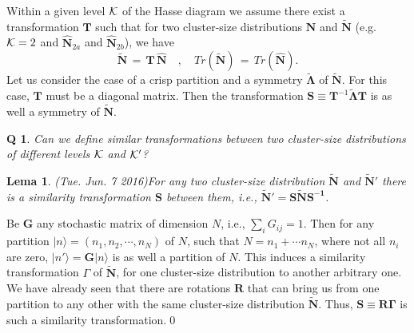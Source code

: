 \documentclass[twocolumn,aps,sort,nofootinbib]{revtex4}
\newtheorem{lema}{Lema}[section]
\newtheorem{question}{Q}
\begin{document}
Within a given level ${\cal K}$ of the Hasse diagram we assume 
there exist a transformation $\mathbf{T}$ such that for two
cluster-size distributions $\mathbf{\hat{N}}$ and $\mathbf{\tilde{N}}$
(e.g. ${\cal K}=2$ and $\mathbf{\hat{N}}_{2a}$ and $\mathbf{\hat{N}}_{2b}$),
we have
\begin{equation}
\mathbf{\tilde{N}}\,=\,\mathbf{T}\,\mathbf{\hat{N}}\quad ,\quad 
Tr(\mathbf{\tilde{N}})\,=\,Tr(\mathbf{\hat{N}}).
\end{equation}
Let us consider the case of a crisp partition and a symmetry
$\mathbf{\tilde{\Lambda}}$ of $\mathbf{\tilde{N}}$.
For this case, $\mathbf{T}$ must be a diagonal matrix.
Then the transformation 
$\mathbf{S}\equiv\mathbf{T}^{-1}\mathbf{\tilde{\Lambda}}\mathbf{T}$
is as well a symmetry of $\mathbf{\tilde{N}}$.
\begin{question}
Can we define similar transformations between 
two cluster-size distributions of different levels ${\cal K}$ and ${\cal K}'$?
\label{QTransfAcrossHasseLevels}
\end{question}
\begin{lema}
(Tue. Jun. 7 2016)For any two cluster-size distribution $\mathbf{\tilde{N}}$ and $\mathbf{\tilde{N}'}$ there is
a similarity transformation $\mathbf{S}$ between them, i.e., 
$\mathbf{\tilde{N}'} = \mathbf{S} \mathbf{\tilde{N}} \mathbf{S^{-1}}$. 
\label{CTransfAcrossHasseLevels}
\end{lema}
Be $\mathbf{G}$ any stochastic matrix of dimension $N$, i.e., $\sum_i G_{ij}=1$. 
Then for any partition $|n\rangle=(n_1,n_2,\cdots,n_N)$ of $N$,
such that $N=n_1+\cdots n_N$, where not all $n_i$ are zero, 
$|n'\rangle=\mathbf{G}|n\rangle$ is as well a partition of $N$.
This induces a similarity transformation $\Gamma$ of $\mathbf{\tilde{N}}$, for one 
cluster-size distribution to another arbitrary one.
We have already seen that there are rotations $\mathbf{R}$ that can bring us from one 
partition to any other with the same cluster-size distribution $\mathbf{\tilde{N}}$. 
Thus, $\mathbf{S}\equiv \mathbf{R}\mathbf{\Gamma}$ is such a similarity transformation.\qed
\end{document}

